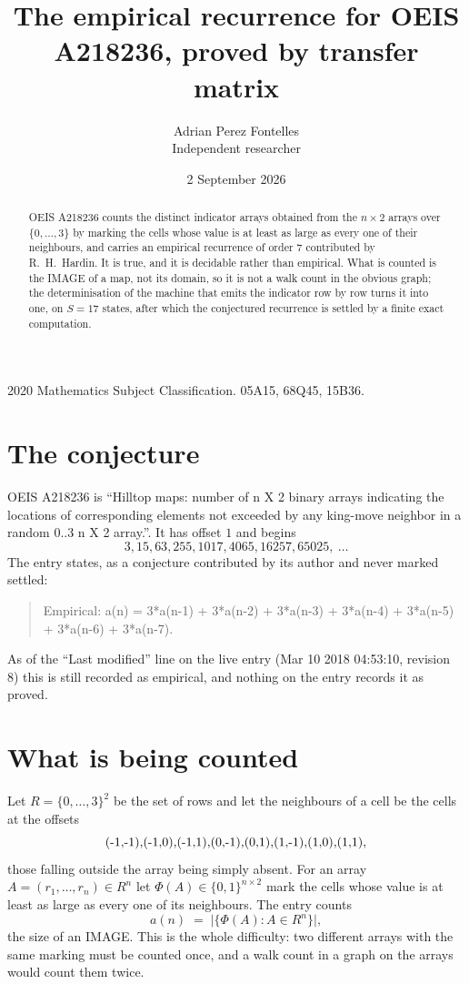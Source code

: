 \documentclass[11pt,a4paper]{article}
\title{The empirical recurrence for OEIS A218236, proved by transfer matrix}
\author{Adrian Perez Fontelles\\ \small Independent researcher}
\date{2 September 2026}
\theoremstyle{plain}
\theoremstyle{definition}
\begin{document}
\maketitle

\begin{abstract}
OEIS A218236 counts the distinct indicator arrays obtained from the $n\times2$ arrays over
$\{0,\dots,3\}$ by marking the cells whose value is at least as large as every one of their neighbours, and carries an
empirical recurrence of order $7$ contributed by R.~H.~Hardin. It is true, and it is
decidable rather than empirical. What is counted is the IMAGE of a map, not its domain, so it
is not a walk count in the obvious graph; the determinisation of the machine that emits the
indicator row by row turns it into one, on $S=17$ states, after which the conjectured
recurrence is settled by a finite exact computation.
\end{abstract}

\noindent\small 2020 Mathematics Subject Classification. 05A15, 68Q45, 15B36.\normalsize

\section{The conjecture}

OEIS A218236 is ``Hilltop maps: number of n X 2 binary arrays indicating the locations of corresponding elements not exceeded by any king-move neighbor in a random 0..3 n X 2 array.''. It has offset $1$ and begins
\[
3, 15, 63, 255, 1017, 4065, 16257, 65025,\ \dots
\]
The entry states, as a conjecture contributed by its author and never marked settled:
\begin{quote}
Empirical: a(n) = 3*a(n-1) + 3*a(n-2) + 3*a(n-3) + 3*a(n-4) + 3*a(n-5) + 3*a(n-6) + 3*a(n-7).
\end{quote}
As of the ``Last modified'' line on the live entry (Mar 10 2018 04:53:10, revision 8) this is still
recorded as empirical, and nothing on the entry records it as proved.

\section{What is being counted}

Let $R=\{0,\dots,3\}^{2}$ be the set of rows and let the neighbours of a cell be the
cells at the offsets
\[
$(-1,-1)$, $(-1,0)$, $(-1,1)$, $(0,-1)$, $(0,1)$, $(1,-1)$, $(1,0)$, $(1,1)$,
\]
those falling outside the array being simply absent. For an array
$A=(r_1,\dots,r_n)\in R^n$ let $\Phi(A)\in\{0,1\}^{n\times2}$ mark the cells whose value
is at least as large as every one of its neighbours. The entry counts
\[
a(n)\;=\;\bigl|\{\Phi(A):A\in R^n\}\bigr| ,
\]
the size of an IMAGE. This is the whole difficulty: two different arrays with the same marking
must be counted once, and a walk count in a graph on the arrays would count them twice.
\end{document}
